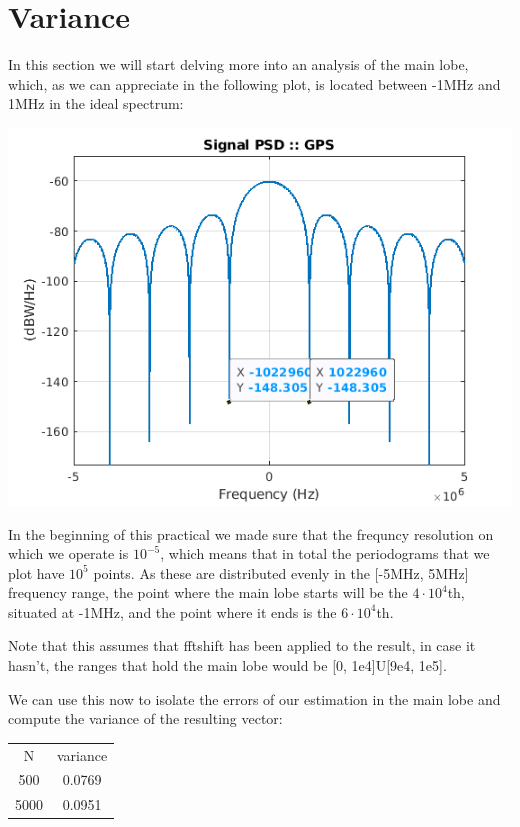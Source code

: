 \documentclass[conference,9pt]{IEEEtran}
\begin{document}
\section{Variance}
In this section we will start delving more into an analysis of the main lobe, which, as we can appreciate in the following plot, is located between -1MHz and 1MHz in the ideal spectrum:

\includegraphics[scale=0.6]{mainlobe.png}

In the beginning of this practical we made sure that the frequncy resolution on which we operate is $10^{-5}$, which means that in total the periodograms that we plot have $10^{5}$ points. As these are distributed evenly in the [-5MHz, 5MHz] frequency range, the point where the main lobe starts will be the $4\cdot 10^4$th, situated at -1MHz, and the point where it ends is the $6\cdot 10^4$th.

Note that this assumes that fftshift has been applied to the result, in case it hasn't, the ranges that hold the main lobe would be [0, 1e4]U[9e4, 1e5].

We can use this now to isolate the errors of our estimation in the main lobe and compute the variance of the resulting vector:

\begin{center}
  \begin{tabular}{ c c }
   N & variance \\ 
   500 &  0.0769 \\  
   5000 & 0.0951    
  \end{tabular}
\end{center}
\end{document}
